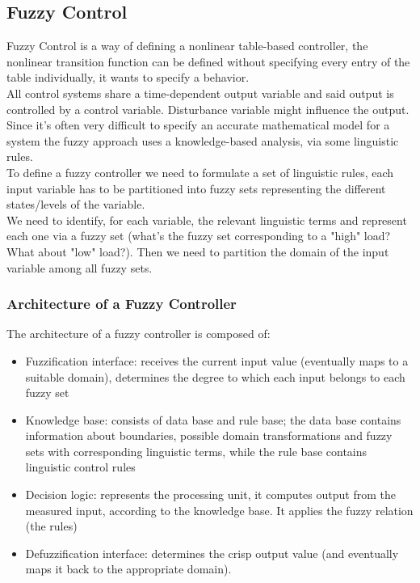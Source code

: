 \subsection{Fuzzy Control}

Fuzzy Control is a way of defining a nonlinear table-based controller, the nonlinear transition function can be defined without specifying every entry of the table individually, it wants to specify a behavior.\\
All control systems share a time-dependent output variable and said output is controlled by a control variable. Disturbance variable might influence the output.\\

Since it's often very difficult to specify an accurate mathematical model for a system the fuzzy approach uses a knowledge-based analysis, via some linguistic rules.\\
To define a fuzzy controller we need to formulate a set of linguistic rules, each input variable has to be partitioned into fuzzy sets representing the different states/levels of the variable. \\
We need to identify, for each variable, the relevant linguistic terms and represent each one via a fuzzy set (what's the fuzzy set corresponding to a "high" load? What about "low" load?). Then we need to partition the domain of the input variable among all fuzzy sets.\\

\subsubsection{Architecture of a Fuzzy Controller}
The architecture of a fuzzy controller is composed of: 
\begin{itemize}
	\item Fuzzification interface: receives the current input value (eventually maps to a suitable domain), determines the degree to which each input belongs to each fuzzy set
	\item Knowledge base: consists of data base and rule base; the data base contains information about boundaries, possible domain transformations and fuzzy sets with corresponding linguistic terms, while the rule base contains linguistic control rules
	\item Decision logic: represents the processing unit, it computes output from the measured input, according to the knowledge base. It applies the fuzzy relation (the rules)
	\item Defuzzification interface: determines the crisp output value (and eventually maps it back to the appropriate domain).
\end{itemize}

